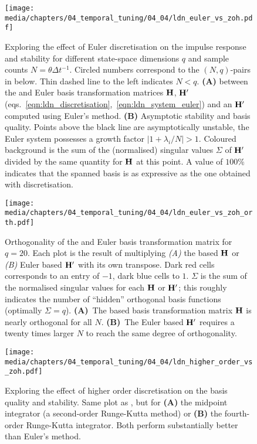 \begin{figure}
	\centering
	\texttt{[image: media/chapters/04\_temporal\_tuning/04\_04/ldn\_euler\_vs\_zoh.pdf]}%
	{\label{fig:ldn_euler_vs_zoh_a}}%
	{\label{fig:ldn_euler_vs_zoh_b}}%
	\caption[Exploring the effect of Euler discretisation on the LDN impulse response and stability]{
	Exploring the effect of Euler discretisation on the \LDN impulse response and stability for different state-space dimensions $q$ and sample counts $N = \theta \Delta t^{-1}$.
	Circled numbers correspond to the $(N, q)$-pairs in  below. Thin dashed line to the left indicates $N < q$.
	\textbf{(A)} \NRMSE between the \ZOH and Euler basis transformation matrices $\mathbf{H}$, $\mathbf{H}'$ (eqs.~\ref{eqn:ldn_discretisation},~\ref{eqn:ldn_system_euler}) and an $\mathbf{H}'$ computed using Euler's method.
	\textbf{(B)} Asymptotic stability and basis quality.
	Points above the black line are asymptotically unstable, the Euler system possesses a growth factor $|1 + \lambda_i / N| > 1$.
	Coloured background is the sum of the (normalised) singular values $\Sigma$ of $\mathbf{H}'$ divided by the same quantity for $\mathbf{H}$ at this point.
	A value of $100\%$ indicates that the spanned basis is as expressive as the one obtained with \ZOH discretisation.
	}
	\label{fig:ldn_euler_vs_zoh}
\end{figure}

\begin{figure}
	\centering
	\texttt{[image: media/chapters/04\_temporal\_tuning/04\_04/ldn\_euler\_vs\_zoh\_orth.pdf]}
	\caption[Orthogonality of the ZOH and Euler LDN basis transformation matrix]{
	Orthogonality of the \ZOH and Euler \LDN basis transformation matrix for $q = 20$.
	Each plot is the result of multiplying \emph{(A)} the \ZOH based $\mathbf{H}$ or \emph{(B)} Euler based $\mathbf{H}'$ with its own transpose.
	Dark red cells corresponds to an entry of $-1$, dark blue cells to $1$.
	$\Sigma$ is the sum of the normalised singular values for each $\mathbf{H}$ or $\mathbf{H}'$; this roughly indicates the number of \enquote{hidden} orthogonal basis functions (optimally $\Sigma = q$).
	\textbf{(A)}~The \ZOH based basis transformation matrix $\mathbf{H}$ is nearly orthogonal for all $N$.
	\textbf{(B)}~The Euler based $\mathbf{H}'$ requires a twenty times larger $N$ to reach the same degree of orthogonality.
	}
	\label{fig:ldn_euler_vs_zoh_orth}
\end{figure}

\begin{figure}
	\centering
	\texttt{[image: media/chapters/04\_temporal\_tuning/04\_04/ldn\_higher\_order\_vs\_zoh.pdf]}%
	\caption[Exploring the effect of higher order discretisation on the LDN basis quality]{
	Exploring the effect of higher order discretisation on the \LDN basis quality and stability.
	Same plot as , but for \textbf{(A)} the midpoint integrator (a second-order Runge-Kutta method) or \textbf{(B)} the fourth-order Runge-Kutta integrator. Both perform substantially better than Euler's method.
	}
	\label{fig:ldn_higher_order_vs_zoh}
\end{figure}

